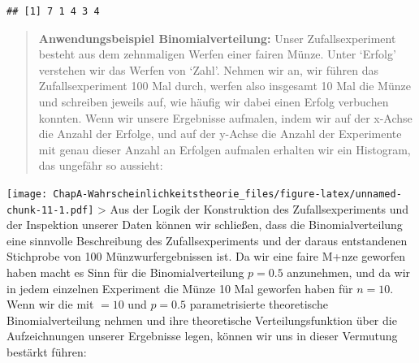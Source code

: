 \documentclass[]{book}
\begin{document}
\begin{verbatim}
## [1] 7 1 4 3 4
\end{verbatim}

\begin{quote}
\textbf{Anwendungsbeispiel Binomialverteilung:} Unser Zufallsexperiment
besteht aus dem zehnmaligen Werfen einer fairen Münze. Unter `Erfolg'
verstehen wir das Werfen von `Zahl'. Nehmen wir an, wir führen das
Zufallsexperiment 100 Mal durch, werfen also insgesamt 10 Mal die Münze
und schreiben jeweils auf, wie häufig wir dabei einen Erfolg verbuchen
konnten. Wenn wir unsere Ergebnisse aufmalen, indem wir auf der x-Achse
die Anzahl der Erfolge, und auf der y-Achse die Anzahl der Experimente
mit genau dieser Anzahl an Erfolgen aufmalen erhalten wir ein Histogram,
das ungefähr so aussieht:
\end{quote}

\texttt{[image: ChapA-Wahrscheinlichkeitstheorie\_files/figure-latex/unnamed-chunk-11-1.pdf]}
\textgreater{} Aus der Logik der Konstruktion des Zufallsexperiments und
der Inspektion unserer Daten können wir schließen, dass die
Binomialverteilung eine sinnvolle Beschreibung des Zufallsexperiments
und der daraus entstandenen Stichprobe von 100 Münzwurfergebnissen ist.
Da wir eine faire M+nze geworfen haben macht es Sinn für die
Binomialverteilung \(p=0.5\) anzunehmen, und da wir in jedem einzelnen
Experiment die Münze 10 Mal geworfen haben für \(n=10\). Wenn wir die
mit \(=10\) und \(p=0.5\) parametrisierte theoretische
Binomialverteilung nehmen und ihre theoretische Verteilungsfunktion über
die Aufzeichnungen unserer Ergebnisse legen, können wir uns in dieser
Vermutung bestärkt führen:
\end{document}
